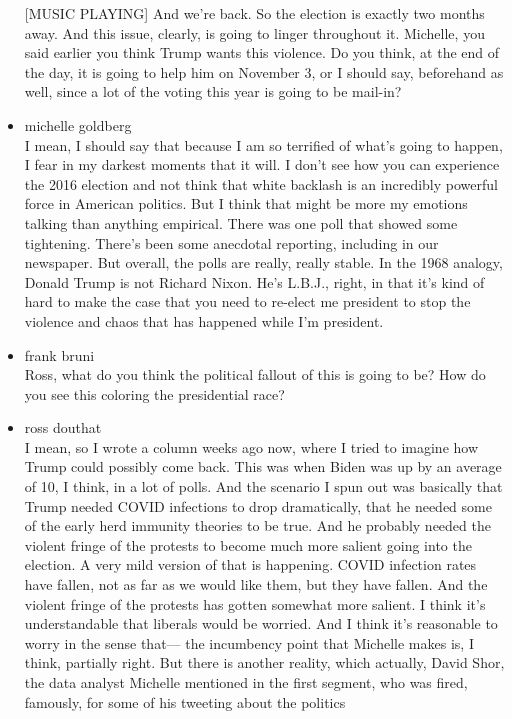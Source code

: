 \begin{itemize}
  {[}MUSIC PLAYING{]} And we're back. So the election is exactly two
  months away. And this issue, clearly, is going to linger throughout
  it. Michelle, you said earlier you think Trump wants this violence. Do
  you think, at the end of the day, it is going to help him on November
  3, or I should say, beforehand as well, since a lot of the voting this
  year is going to be mail-in?
\item
  michelle goldberg\\
  I mean, I should say that because I am so terrified of what's going to
  happen, I fear in my darkest moments that it will. I don't see how you
  can experience the 2016 election and not think that white backlash is
  an incredibly powerful force in American politics. But I think that
  might be more my emotions talking than anything empirical. There was
  one poll that showed some tightening. There's been some anecdotal
  reporting, including in our newspaper. But overall, the polls are
  really, really stable. In the 1968 analogy, Donald Trump is not
  Richard Nixon. He's L.B.J., right, in that it's kind of hard to make
  the case that you need to re-elect me president to stop the violence
  and chaos that has happened while I'm president.
\item
  frank bruni\\
  Ross, what do you think the political fallout of this is going to be?
  How do you see this coloring the presidential race?
\item
  ross douthat\\
  I mean, so I wrote a column weeks ago now, where I tried to imagine
  how Trump could possibly come back. This was when Biden was up by an
  average of 10, I think, in a lot of polls. And the scenario I spun out
  was basically that Trump needed COVID infections to drop dramatically,
  that he needed some of the early herd immunity theories to be true.
  And he probably needed the violent fringe of the protests to become
  much more salient going into the election. A very mild version of that
  is happening. COVID infection rates have fallen, not as far as we
  would like them, but they have fallen. And the violent fringe of the
  protests has gotten somewhat more salient. I think it's understandable
  that liberals would be worried. And I think it's reasonable to worry
  in the sense that--- the incumbency point that Michelle makes is, I
  think, partially right. But there is another reality, which actually,
  David Shor, the data analyst Michelle mentioned in the first segment,
  who was fired, famously, for some of his tweeting about the politics

\end{itemize}
